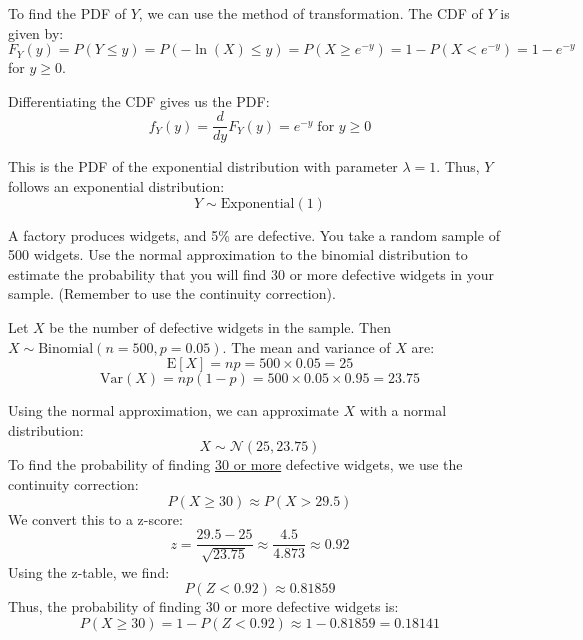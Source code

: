 \documentclass[a4paper, 10pt]{article}
\begin{document}
\begin{solution}
To find the PDF of \( Y \), we can use the method of transformation. The CDF of \( Y \) is given by:
\[
F_Y(y) = P(Y \leq y) = P(-\ln(X) \leq y) = P(X \geq e^{-y}) = 1 - P(X < e^{-y}) = 1 - e^{-y}
\]
for \( y \geq 0 \).

Differentiating the CDF gives us the PDF:
\[
\boxed{f_Y(y) = \frac{d}{dy} F_Y(y) = e^{-y}} \; \text{for } y \geq 0
\]

This is the PDF of the exponential distribution with parameter \( \lambda = 1 \). Thus, \( Y \) follows an exponential distribution:
\[
\boxed{Y \sim \text{Exponential}(1)}
\]
\end{solution}


\begin{problem}
A factory produces widgets, and 5\% are defective. You take a random sample of 500 widgets.
Use the normal approximation to the binomial distribution to estimate the probability that you will find 30 or more defective widgets in your sample.
(Remember to use the continuity correction).
\end{problem}

\begin{solution}
Let \( X \) be the number of defective widgets in the sample. Then \( X \sim \text{Binomial}(n=500, p=0.05) \).
The mean and variance of \( X \) are:
\[ \text{E}[X] = np = 500 \times 0.05 = 25 \]
\[ \text{Var}(X) = np(1-p) = 500 \times 0.05 \times 0.95 = 23.75 \]

Using the normal approximation, we can approximate \( X \) with a normal distribution:
\[ X \sim \mathcal{N}(25, 23.75) \]
To find the probability of finding \underline{30 or more} defective widgets, we use the continuity correction:
\[ P(X \geq 30) \approx P(X > 29.5) \]
We convert this to a z-score:
\[ z = \frac{29.5 - 25}{\sqrt{23.75}} \approx \frac{4.5}{4.873} \approx 0.92 \]
Using the z-table, we find:
\[ P(Z < 0.92) \approx 0.81859 \]
Thus, the probability of finding 30 or more defective widgets is:
\[ P(X \geq 30) = 1 - P(Z < 0.92) \approx 1 - 0.81859 = \boxed{0.18141} \]
\end{solution}
\end{document}
